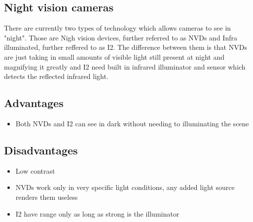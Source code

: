 
\subsection{Night vision cameras}
There are currently two types of technology which allows cameras to see in "night". Those are Nigh vision devices, further referred to as NVDs and Infra illuminated, further reffered to as I2. The difference between them is that NVDs are just taking in small amounts of visible light still present at night and magnifying it greatly and I2 need built in infrared illuminator and sensor which detects the reflected infrared light. 

\subsection*{Advantages}
\begin{itemize}
  \item Both NVDs and I2 can see in dark without needing to illuminating the scene
\end{itemize}

\subsection*{Disadvantages}
\begin{itemize}
  \item Low contrast
  \item NVDs work only in very specific light conditions, any added light source renders them useless
  \item I2 have range only as long as strong is the illuminator
\end{itemize}

\color{black}